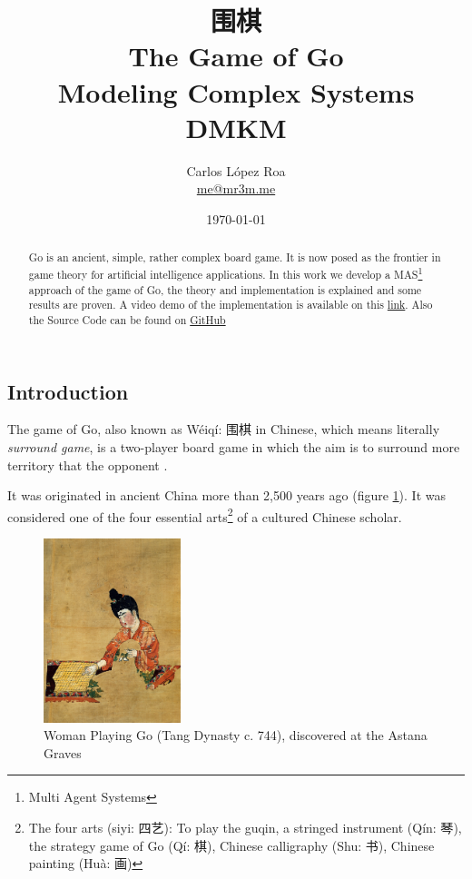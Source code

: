 \documentclass[a4paper,10pt,twocolumn]{article}
\title{围棋 \\ The Game of Go\\ \small Modeling Complex Systems\\ DMKM}
\author{Carlos López Roa\\ \href{mailto:me@mr3m.me}{me@mr3m.me}}
\date{\today}
\begin{document}
\begin{CJK*}{UTF8}{gbsn}
\maketitle
{}

\begin{abstract}
Go is an ancient, simple, rather complex board game. It is now posed as the frontier in game theory for artificial intelligence applications. In this work we develop a MAS\footnote{Multi Agent Systems} approach of the game of Go, the theory and implementation is explained and some results are proven. A video demo of the implementation is available on this \href{https://youtu.be/Wvm0ZgCsm1E}{link}. Also the Source Code can be found on \href{https://github.com/mr3m/GameOfGo}{GitHub}
\end{abstract}


\section{Introduction}
The game of Go, also known as {Wéiqí: 围棋} in Chinese, which means literally \emph{surround game}, is a two-player board game in which the aim is to surround more territory that the opponent \cite{Kunkle2002}.

It was originated in ancient China more than 2,500 years ago (figure \ref{l1}). It was considered one of the four essential arts\footnote{The four arts ({siyi: 四艺}): To play the guqin, a stringed instrument ({Qín:  琴}), the strategy game of Go ({Qí:  棋}), Chinese calligraphy ({Shu:  书}), Chinese painting ({Huà:  画}) } of a cultured Chinese scholar.

\begin{figure}[!ht]
\begin{center}
\includegraphics[width=4cm]{Astana.jpg}
\caption{\footnotesize{Woman Playing Go (Tang Dynasty c. 744), discovered at the Astana Graves}\label{l1}}
\end{center}
\end{figure}


\end{CJK*}
\end{document}
